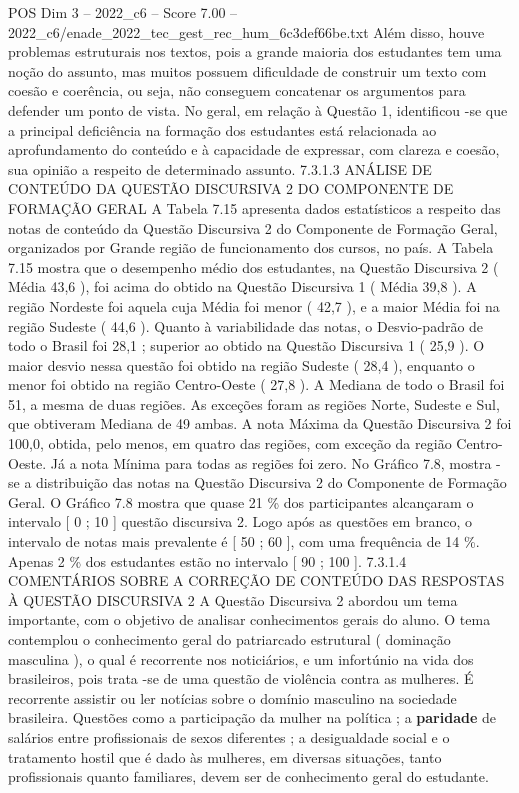 \begin{textsample}{POS Dim 3 – 2022\_c6 – Score 7.00 – 2022\_c6/enade\_2022\_tec\_gest\_rec\_hum\_6c3def66be.txt}
Além disso, houve problemas estruturais nos textos, pois a grande maioria dos estudantes tem uma noção do assunto, mas muitos possuem dificuldade de construir um texto com coesão e coerência, ou seja, não conseguem concatenar os argumentos para defender um ponto de vista.
No geral, em relação à Questão 1, identificou -se que a principal deficiência na formação dos estudantes está relacionada ao aprofundamento do conteúdo e à capacidade de expressar, com clareza e coesão, sua opinião a respeito de determinado assunto. 7.3.1.3 ANÁLISE DE CONTEÚDO DA QUESTÃO DISCURSIVA 2 DO COMPONENTE DE FORMAÇÃO GERAL A Tabela 7.15 apresenta dados estatísticos a respeito das notas de conteúdo da Questão Discursiva 2 do Componente de Formação Geral, organizados por Grande região de funcionamento dos cursos, no país.
A Tabela 7.15 mostra que o desempenho médio dos estudantes, na Questão Discursiva 2 ( Média 43,6 ), foi acima do obtido na Questão Discursiva 1 ( Média 39,8 ).
A região Nordeste foi aquela cuja Média foi menor ( 42,7 ), e a maior Média foi na região Sudeste ( 44,6 ).
Quanto à variabilidade das notas, o Desvio-padrão de todo o Brasil foi 28,1 ; superior ao obtido na Questão Discursiva 1 ( 25,9 ).
O maior desvio nessa questão foi obtido na região Sudeste ( 28,4 ), enquanto o menor foi obtido na região Centro-Oeste ( 27,8 ).
A Mediana de todo o Brasil foi 51, a mesma de duas regiões.
As exceções foram as regiões Norte, Sudeste e Sul, que obtiveram Mediana de 49 ambas.
A nota Máxima da Questão Discursiva 2 foi 100,0, obtida, pelo menos, em quatro das regiões, com exceção da região Centro-Oeste.
Já a nota Mínima para todas as regiões foi zero.
No Gráfico 7.8, mostra -se a distribuição das notas na Questão Discursiva 2 do Componente de Formação Geral.
O Gráfico 7.8 mostra que quase 21 \% dos participantes alcançaram o intervalo [ 0 ; 10 ] questão discursiva 2.
Logo após as questões em branco, o intervalo de notas mais prevalente é [ 50 ; 60 ], com uma frequência de 14 \%.
Apenas 2 \% dos estudantes estão no intervalo [ 90 ; 100 ]. 7.3.1.4 COMENTÁRIOS SOBRE A CORREÇÃO DE CONTEÚDO DAS RESPOSTAS À QUESTÃO DISCURSIVA 2 A Questão Discursiva 2 abordou um tema importante, com o objetivo de analisar conhecimentos gerais do aluno.
O tema contemplou o conhecimento geral do patriarcado estrutural ( dominação masculina ), o qual é recorrente nos noticiários, e um infortúnio na vida dos brasileiros, pois trata -se de uma questão de violência contra as mulheres.
É recorrente assistir ou ler notícias sobre o domínio masculino na sociedade brasileira.
Questões como a participação da mulher na política ; a \textbf{paridade} de salários entre profissionais de sexos diferentes ; a desigualdade social e o tratamento hostil que é dado às mulheres, em diversas situações, tanto profissionais quanto familiares, devem ser de conhecimento geral do estudante.

\end{textsample}
